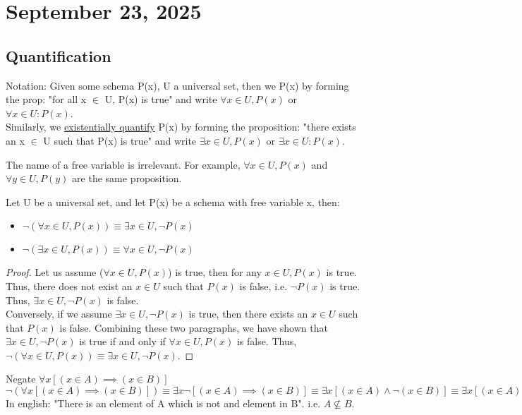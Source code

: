 \section{September 23, 2025}
\subsection{Quantification}
Notation: Given some schema P(x), U a universal set, then we  P(x) by forming the prop: "for all x $\in$ U, P(x) is true" and write $\forall x \in U, P(x)$ or $\forall x \in U: P(x)$.
\\
Similarly, we \underline{existentially quantify} P(x) by forming the proposition: "there exists an x $\in$ U such that P(x) is true" and write $\exists x \in U, P(x)$ or $\exists x \in U: P(x)$.
\begin{note}
  The name of a free variable is irrelevant. For example, $\forall x \in U, P(x)$ and $\forall y \in U, P(y)$ are the same proposition.
\end{note}
\begin{prop}
  Let U be a universal set, and let P(x) be a schema with free variable x, then:
  \begin{itemize}
    \item $\neg (\forall x \in U, P(x)) \equiv \exists x \in U, \neg P(x)$
    \item $\neg (\exists x \in U, P(x)) \equiv \forall x \in U, \neg P(x)$
  \end{itemize}
\end{prop}
\begin{proof}
  Let us assume ($\forall x \in U, P(x)$) is true, then for any $x \in U, P(x)$ is true. Thus, there does not exist an $x \in U$ such that $P(x)$ is false, i.e. $\neg P(x)$ is true. Thus, $\exists x \in U, \neg P(x)$ is false.
  \\
  Conversely, if we assume $\exists x \in U, \neg P(x)$ is true, then there exists an $x \in U$ such that $P(x)$ is false. Combining these two paragraphs, we have shown that $\exists x \in U, \neg P(x)$ is true if and only if $\forall x \in U, P(x)$ is false. Thus, $\neg (\forall x \in U, P(x)) \equiv \exists x \in U, \neg P(x)$.
\end{proof}
\begin{example}
  Negate $\forall x [(x \in A) \implies (x \in B)]$
  \\
  $\neg (\forall x [(x \in A) \implies (x \in B)]) \equiv \exists x \neg [(x \in A) \implies (x \in B)] \equiv \exists x [(x \in A) \land \neg (x \in B)] \equiv \exists x [(x \in A) \land (x \notin B)]$
  \\
  In english: "There is an element of A which is not and element in B". i.e. $A \not\subseteq B$.
\end{example}

